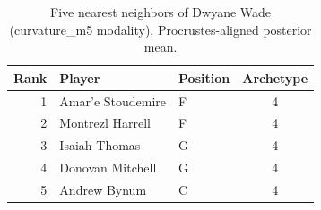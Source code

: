 \begin{table}[htbp]
  \centering\small
  \begin{tabular}{rllc}
    \toprule
    Rank & Player & Position & Archetype \\
    \midrule
    1 & Amar'e Stoudemire & F & 4 \\
    2 & Montrezl Harrell & F & 4 \\
    3 & Isaiah Thomas & G & 4 \\
    4 & Donovan Mitchell & G & 4 \\
    5 & Andrew Bynum & C & 4 \\
    \bottomrule
  \end{tabular}
  \caption{Five nearest neighbors of Dwyane Wade (curvature_m5 modality), Procrustes-aligned posterior mean.}
  \label{tab:Dwyane_Wade_neighbors_curvature_m5}
\end{table}


